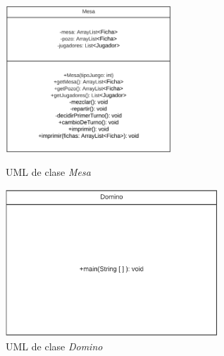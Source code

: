 \documentclass[12pt]{article}
\newcommand{\linejump}{\hfill \break}
\begin{document}
  \begin{figure}[h!]
    \centering
    \begin{minipage}[l]{0.45\textwidth}
      \centering
      \includegraphics[height=5.5cm]{uml5.png}
      \caption{UML de clase \textit{Mesa}}
    \end{minipage}
    \begin{minipage}[r]{0.45\textwidth}
      \centering
      \includegraphics[height=5.5cm]{uml6.png}
      \caption{UML de clase \textit{Domino}} 
    \end{minipage}
  \end{figure}

  \linejump
\end{document}
